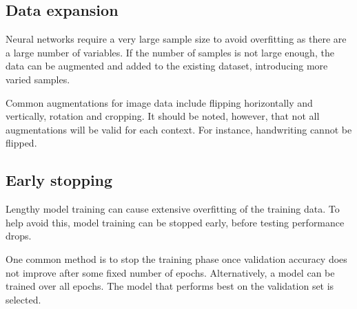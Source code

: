 \subsection*{Data expansion}

Neural networks require a very large sample size to avoid overfitting as there are a large number of variables. If the number of samples is not large enough, the data can be augmented and added to the existing dataset, introducing more varied samples.

Common augmentations for image data include flipping horizontally and vertically, rotation and cropping. It should be noted, however, that not all augmentations will be valid for each context. For instance, handwriting cannot be flipped. 

\subsection*{Early stopping}\label{nnets-earlystop}

Lengthy model training can cause extensive overfitting of the training data. To help avoid this, model training can be stopped early, before testing performance drops.

One common method is to stop the training phase once validation accuracy does not improve after some fixed number of epochs. Alternatively, a model can be trained over all epochs. The model that performs best on the validation set is selected.








%